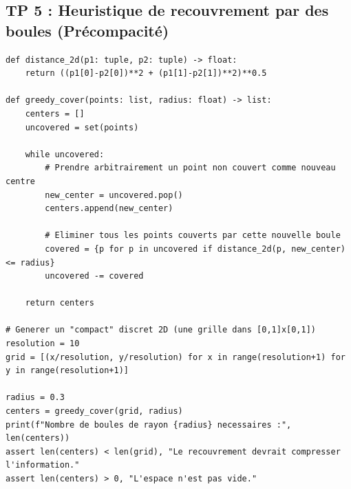 \documentclass[11pt,a4paper]{article}
\begin{document}
\subsection*{TP 5 : Heuristique de recouvrement par des boules (Précompacité)}

\begin{lstlisting}
def distance_2d(p1: tuple, p2: tuple) -> float:
    return ((p1[0]-p2[0])**2 + (p1[1]-p2[1])**2)**0.5

def greedy_cover(points: list, radius: float) -> list:
    centers = []
    uncovered = set(points)

    while uncovered:
        # Prendre arbitrairement un point non couvert comme nouveau centre
        new_center = uncovered.pop()
        centers.append(new_center)

        # Eliminer tous les points couverts par cette nouvelle boule
        covered = {p for p in uncovered if distance_2d(p, new_center) <= radius}
        uncovered -= covered

    return centers

# Generer un "compact" discret 2D (une grille dans [0,1]x[0,1])
resolution = 10
grid = [(x/resolution, y/resolution) for x in range(resolution+1) for y in range(resolution+1)]

radius = 0.3
centers = greedy_cover(grid, radius)
print(f"Nombre de boules de rayon {radius} necessaires :", len(centers))
assert len(centers) < len(grid), "Le recouvrement devrait compresser l'information."
assert len(centers) > 0, "L'espace n'est pas vide."
\end{lstlisting}
\end{document}
